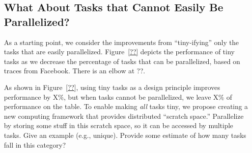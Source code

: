 \subsection{What About Tasks that Cannot Easily Be Parallelized?}
As a starting point, we consider the improvements from ``tiny-ifying'' only the
tasks that are easily parallelized.  Figure~\ref{??} depicts the performance of
tiny tasks as we decrease the percentage of tasks that can be parallelized, based
on traces from Facebook.  There is an elbow at ??.

As shown in Figure~\ref{??}, using tiny tasks as a design principle improves
performance by X\%, but when tasks cannot be parallelized, we leave X\% of
performance on the table.  To enable making \emph{all} tasks tiny, we propose
creating a new computing framework that provides distributed ``scratch space.''
Parallelize by storing some stuff in this scratch space, so it can be accessed
by multiple tasks.  Give an example (e.g., unique). Provide some estimate
of how many tasks fall in this category?

